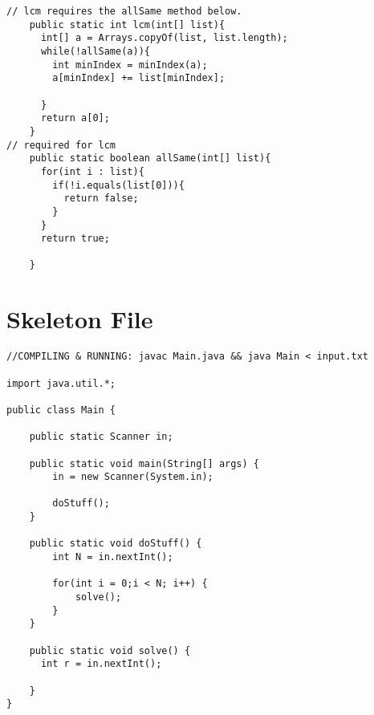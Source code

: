 \documentclass{article}
\begin{document}
\begin{verbatim}
// lcm requires the allSame method below.
    public static int lcm(int[] list){
      int[] a = Arrays.copyOf(list, list.length);
      while(!allSame(a)){
        int minIndex = minIndex(a);
        a[minIndex] += list[minIndex];
        
      }
      return a[0];
    }
// required for lcm
    public static boolean allSame(int[] list){
      for(int i : list){
        if(!i.equals(list[0])){
          return false;
        }
      }
      return true;

    }

\end{verbatim}

\section*{Skeleton File}
\begin{verbatim}
//COMPILING & RUNNING: javac Main.java && java Main < input.txt 

import java.util.*;

public class Main {

    public static Scanner in;
 
    public static void main(String[] args) {
        in = new Scanner(System.in);

        doStuff();
    }

    public static void doStuff() {
        int N = in.nextInt();

        for(int i = 0;i < N; i++) {
            solve();
        }
    }

    public static void solve() {
      int r = in.nextInt();

    }
}
\end{verbatim}
\end{document}

